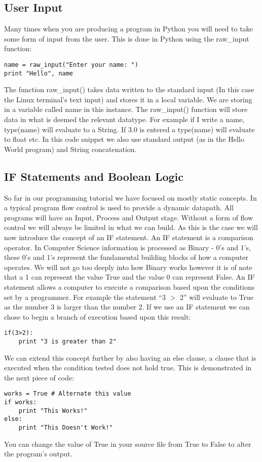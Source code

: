 \documentclass[twocolumn]{article}
\begin{document}
\subsection{User Input}
Many times when you are producing a program in Python you will need to take some form of input from the user. This is done in Python using the raw\_input function:
\begin{lstlisting}
name = raw_input("Enter your name: ") 
print "Hello", name
\end{lstlisting}
The function raw\_input() takes data written to the standard input (In this case the Linux terminal's text input) and stores it in a local variable. We are storing in a variable called name in this instance. The raw\_input() function will store data in what is deemed the relevant datatype. For example if I write a name, type(name) will evaluate to a String. If 3.0 is entered a type(name) will evaluate to float etc. In this code snippet we also use standard output (as in the Hello World program) and String concatenation. 

\subsection{IF Statements and Boolean Logic}

So far in our programming tutorial we have focused on mostly static concepts. In a typical program flow control is used to provide a dynamic datapath. All programs will have an Input, Process and Output stage. Without a form of flow control we will always be limited in what we can build. As this is the case we will now introduce the concept of an IF statement. An IF statement is a comparison operator. In Computer Science information is processed as Binary - 0's and 1's, these 0's and 1's represent the fundamental building blocks of how a computer operates. We will not go too deeply into how Binary works however it is of note that a 1 can represent the value True and the value 0 can represent False. An IF statement allows a computer to execute a comparison based upon the conditions set by a programmer. For example the statement ``3 $>$ 2'' will evaluate to True as the number 3 is larger than the number 2. If we use an IF statement we can chose to begin a branch of execution based upon this result:
\begin{lstlisting}
if(3>2):
	print "3 is greater than 2"
\end{lstlisting}

We can extend this concept further by also having an else clause, a clause that is executed when the condition tested does not hold true. This is demonstrated in the next piece of code:
\begin{lstlisting}
works = True # Alternate this value
if works:
	print "This Works!"
else:
	print "This Doesn't Work!"
\end{lstlisting}
You can change the value of True in your source file from True to False to alter the program's output.
\end{document}
